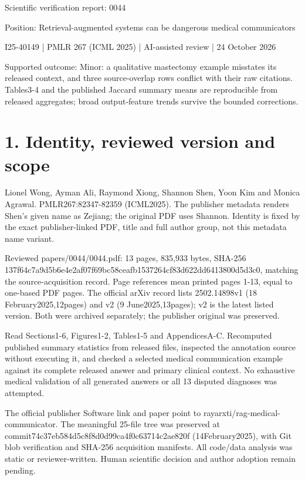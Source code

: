 \documentclass[10pt]{article}
\begin{document}
Scientific verification report: 0044\par
Position: Retrieval-augmented systems can be dangerous medical communicators\par
I25-40149 | PMLR 267 (ICML 2025) | AI-assisted review | 24 October 2026\par
Supported outcome: Minor: a qualitative mastectomy example misstates its released context, and three source-overlap rows conflict with their raw citations. Tables3-4 and the published Jaccard summary means are reproducible from released aggregates; broad output-feature trends survive the bounded corrections.\par
\section*{1. Identity, reviewed version and scope}
Lionel Wong, Ayman Ali, Raymond Xiong, Shannon Shen, Yoon Kim and Monica Agrawal. PMLR267:82347-82359 (ICML2025). The publisher metadata renders Shen’s given name as Zejiang; the original PDF uses Shannon. Identity is fixed by the exact publisher-linked PDF, title and full author group, not this metadata name variant.\par
Reviewed papers/0044/0044.pdf: 13 pages, 835,933 bytes, SHA-256 137f64c7a9d5b6e4e2af07f69bc58ceafb1537264cf83d622dd6413800d5d3c0, matching the source-acquisition record. Page references mean printed pages 1-13, equal to one-based PDF pages. The official arXiv record lists 2502.14898v1 (18 February2025,12pages) and v2 (9 June2025,13pages); v2 is the latest listed version. Both were archived separately; the publisher original was preserved.\par
Read Sections1-6, Figures1-2, Tables1-5 and AppendicesA-C. Recomputed published summary statistics from released files, inspected the annotation source without executing it, and checked a selected medical communication example against its complete released answer and primary clinical context. No exhaustive medical validation of all generated answers or all 13 disputed diagnoses was attempted.\par
The official publisher Software link and paper point to rayarxti/rag-medical-communicator. The meaningful 25-file tree was preserved at commit74c37eb584d5c8f8d0d99ca4f0c63714c2ae820f (14February2025), with Git blob verification and SHA-256 acquisition manifests. All code/data analysis was static or reviewer-written. Human scientific decision and author adoption remain pending.\par
\end{document}
